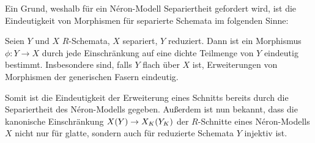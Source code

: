 Ein Grund, weshalb für ein Néron-Modell Separiertheit gefordert wird,
ist die Eindeutigkeit von Morphismen für separierte Schemata im
folgenden Sinne:
\begin{Satz}\label{thm:erweindeutig}
  Seien $Y$ und $X$ $R$-Schemata, $X$ separiert, $Y$
  reduziert.
  Dann ist ein Morphismus $\phi\colon Y\to X$ durch jede
  Einschränkung auf eine dichte Teilmenge von $Y$ eindeutig bestimmt.
  Insbesondere sind, falls $Y$ flach über $X$ ist, Erweiterungen von
  Morphismen der generischen Fasern eindeutig.

\end{Satz}
Somit ist die Eindeutigkeit der Erweiterung eines Schnitts bereits
durch die Separiertheit des Néron-Modells gegeben. Außerdem ist nun
bekannt, dass die kanonische Einschränkung $X(Y)\to X_{K}(Y_{K})$ der
$R$-Schnitte eines Néron-Modells $X$ nicht nur für glatte, sondern
auch für reduzierte Schemata $Y$ injektiv ist.

